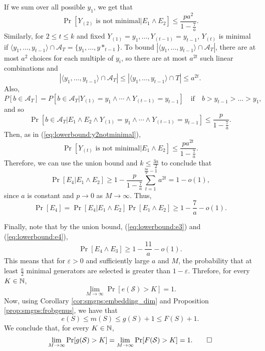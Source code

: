 \begin{itemize}
    If we sum over all possible $y_1$, we get that 
    \begin{equation}\label{eq:lowerbound:y2notminimal}
        \Pr[Y_{(2)} \text{ is not minimal}|E_1\land E_2] \leq \frac{pa^2}{1 - \frac{7}{a}}.
    \end{equation}
    Similarly, for $2 \leq t \leq k$ and fixed $Y_{(1)} = y_1, \ldots, Y_{(t - 1)} = y_{t - 1}$, $Y_{(t)}$ is minimal if $\langle y_1, \ldots, y_{t - 1}\rangle \cap \mathcal{A}_T = \{y_1, \ldots, y*_{t - 1}\}$. To bound $|\langle y_1, \ldots, y_{t - 1}\rangle \cap \mathcal{A}_T|$, there are at most $a^2$ choices for each multiple of $y_i$, so there are at most $a^{2t}$ such linear combinations and
    \[|\langle y_1, \ldots, y_{t - 1} \rangle \cap  \mathcal{A}_T| \leq |\langle y_1, \ldots, y_{t - 1} \rangle \cap T| \leq a^{2t}.\]
    Also, 
    \[P[b \in \mathcal{A}_T] = P[b \in \mathcal{A}_T|Y_{(1)} = y_1\land \cdots \land Y_{(t - 1)} = y_{t - 1}] \quad \text{if} \quad  b > y_{t - 1} > \ldots > y_1,\]
    and so
    \[
        \Pr[b \in \mathcal{A}_T|E_1 \land E_2 \land Y_{(1)} = y_1 \land \cdots \land Y_{(t - 1)} = y_{t - 1}] \leq \frac{p}{1 - \frac{7}{a}}.
    \]
    Then, as in (\ref{eq:lowerbound:y2notminimal}), 
    \[\Pr[Y_{(t)} \text{ is not minimal}|E_1\land E_2] \leq \frac{pa^{2t}}{1 - \frac{7}{a}} .\]
    Therefore, we can use the union bound and $k \leq \frac{3a}{2}$ to conclude that
    \[\Pr[E_4|E_1 \land E_2] \geq 1 - \frac{p}{1 - \frac{7}{a}}\sum_{t = 1}^{\frac{3a}{2} - 1}a^{2t} = 1 - o(1),\]
    since $a$ is constant and $p \to 0$ as $M  \to \infty$.
    Thus,  
    \begin{equation}\label{eq:lowerbound:e4}
        \Pr[E_4] = \Pr[E_4| E_1 \land E_2]\Pr[E_1\land E_2] \geq 1 - \frac{7}{a} - o(1).
    \end{equation}
\end{itemize}


Finally, note that by the union bound, (\ref{eq:lowerbound:e3}) and (\ref{eq:lowerbound:e4}),
\[\Pr[E_4 \land E_3] \geq 1 - \frac{11}{a} - o(1).\] 
This means that for $\varepsilon > 0$ and sufficiently large $a$ and $M$, the probability that at least $\frac{a}{2}$ minimal generators are selected is greater than $1 - \varepsilon$. Threfore, for every $K \in \NN$, 
\[\lim_{M \to \infty} \Pr[e(\mathcal{S}) > K] = 1.\]
Now, using Corollary \ref{cor:smgps:embedding_dim} and Proposition \ref{prop:smgps:frobgenus}, we have that
\[e(S) \leq m(S) \leq g(S) + 1 \leq F(S) + 1.\]
We conclude that, for every $K \in \NN$,
\[\lim_{M \to \infty} \Pr[g(\mathcal{S}) > K] = \lim_{M \to \infty} \Pr[F(\mathcal{S}) > K] = 1.\qed\]

